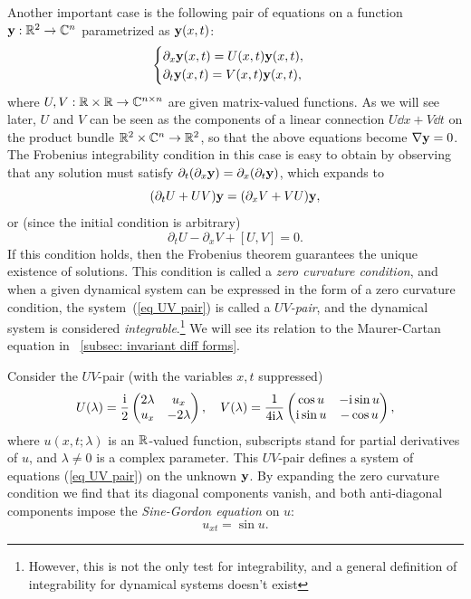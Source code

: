 \begin{example}\label{ex UV pairs}
    Another important case is the following pair of equations on a function $\bf{y}:\bbR^2\to \bbC^n$ parametrized as $\bf{y}(x,t)$:
    \[\begin{cases}
        \partial_x \bf{y}(x,t)= U(x,t)\bf{y}(x,t),\\
        \partial_t \bf{y}(x,t)= V(x,t)\bf{y}(x,t),
    \end{cases}\label{eq UV pair}\]
    where $U,V:\bbR\times\bbR\to \bbC^{n\times n}$ are given matrix-valued functions. As we will see later, $U$ and $V$ can be seen as the components of a linear connection $U\dd x+V\dd t$ on the product bundle $\bbR^2\times\bbC^n\to \bbR^2$, so that the above equations become $\nabla\bf{y}=0$. The Frobenius integrability condition in this case is easy to obtain by observing that any solution must satisfy $\partial_t(\partial_x \bf{y})=\partial_x(\partial_t \bf{y})$, which expands to 
    \[(\partial_t U+UV)\bf{y}=(\partial_x V+VU)\bf{y},\]
    or (since the initial condition is arbitrary)
    \[\partial_t U-\partial_x V+[U,V]=0.\]
    If this condition holds, then the Frobenius theorem guarantees the unique existence of solutions. This condition is called a \emph{zero curvature condition}, and when a given dynamical system can be expressed in the form of a zero curvature condition, the system~(\ref{eq UV pair}) is called a \emph{$UV$-pair}, and the dynamical system is considered \emph{integrable}.\footnote{However, this is not the only test for integrability, and a general definition of integrability for dynamical systems doesn't exist} We will see its relation to the Maurer-Cartan equation in \subsect\ \ref{subsec: invariant diff forms}.
\end{example}

\begin{example}\label{ex sine-gordon}
    Consider the $UV$-pair (with the variables $x,t$ suppressed)
    \[U(\lambda)=\frac{\rmi}{2}\begin{pmatrix}
        2\lambda & u_x\\
        u_x & -2\lambda
    \end{pmatrix},\quad 
    V(\lambda)=\frac{1}{4\rmi \lambda}\begin{pmatrix}
        \cos u & -\rmi \sin u\\
        \rmi \sin u & -\cos u
    \end{pmatrix},
    \]
    where $u(x,t;\lambda)$ is an $\bbR$-valued function, subscripts stand for partial derivatives of $u$, and $\lambda\neq 0$ is a complex parameter. This $UV$-pair defines a system of equations (\ref{eq UV pair}) on the unknown $\bf{y}$. By expanding the zero curvature condition we find that its diagonal components vanish, and both anti-diagonal components impose the \emph{Sine-Gordon equation} on $u$:
    \[u_{xt}=\sin u.\]
\end{example}

